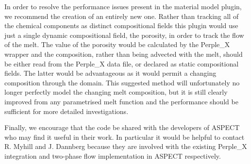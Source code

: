 In order to resolve the performance issues present in the material model plugin, we recommend the creation of an entirely new one.
Rather than tracking all of the chemical components as distinct compositional fields this plugin would use just a single dynamic compositional field, the porosity, in order to track the flow of the melt.
The value of the porosity would be calculated by the Perple\_X wrapper and the composition, rather than being advected with the melt, should be either read from the Perple\_X data file, or declared as static compositional fields.
The latter would be advantageous as it would permit a changing composition through the domain.
This suggested method will unfortunately no longer perfectly model the changing melt composition, but it is still clearly improved from any parametrised melt function and the performance should be sufficient for more detailed investigations.

Finally, we encourage that the code be shared with the developers of ASPECT who may find it useful in their work.
In particular it would be helpful to contact R. Myhill and J. Dannberg because they are involved with the existing Perple\_X integration and two-phase flow implementation in ASPECT respectively.
